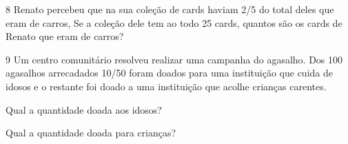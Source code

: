 %
%
%
%
%
%
%


\num{8} Renato percebeu que na sua coleção de cards haviam 2/5 do total
deles que eram de carros, Se a coleção dele tem ao todo 25 cards,
quantos são os cards de Renato que eram de carros?



\num{9} Um centro comunitário resolveu realizar uma campanha do agasalho.
Dos 100 agasalhos arrecadados 10/50 foram doados para uma instituição
que cuida de idosos e o restante foi doado a uma instituição que acolhe
crianças carentes.

\begin{escolha}
\item
  Qual a quantidade doada aos idosos?


\item
  Qual a quantidade doada para crianças?

\end{escolha}

